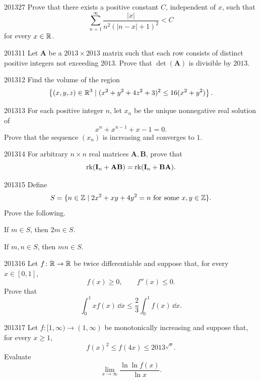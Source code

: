 \begin{problem}{2013}{2}{7}
Prove that there exists a positive constant $C$, independent of $x$, such that
\[
    \sum_{n=1}^{\infty}
    \frac{|x|}{n^2(|n-x|+1)^2}<C
\]
for every $x\in\mathbb{R}$.
\end{problem}

\begin{problem}{2013}{1}{1}
Let $\mathbf A$ be a $2013\times2013$ matrix such that each row consists of distinct positive integers not exceeding $2013$. Prove that $\det(\mathbf A)$ is divisible by $2013$.
\end{problem}

\begin{problem}{2013}{1}{2}
Find the volume of the region
\[
    \left\{(x, y, z)\in\mathbb{R}^3
    \mid
    (x^2+y^2+4z^2+3)^2\le16(x^2+y^2)
    \right\}.
\]
\end{problem}

\begin{problem}{2013}{1}{3}
For each positive integer $n$, let $x_n$ be the unique nonnegative real solution of
\[
    x^n+x^{n-1}+x-1=0.
\]
Prove that the sequence $(x_n)$ is increasing and converges to $1$.
\end{problem}

\begin{problem}{2013}{1}{4}
For arbitrary $n\times n$ real matrices $\mathbf A, \mathbf B$, prove that
\[
    \operatorname{rk}(\mathbf I_n+\mathbf A\mathbf B)
    =
    \operatorname{rk}(\mathbf I_n+\mathbf B\mathbf A).
\]
\end{problem}

\begin{problem}{2013}{1}{5}
Define
\[
    S=\{n\in\mathbb{Z}\mid 2x^2+xy+4y^2=n
    \text{ for some }x, y\in\mathbb{Z}\}.
\]
Prove the following.
\begin{problemsubparts}
    \item If $m\in S$, then $2m\in S$.
    \item If $m, n\in S$, then $mn\in S$.
\end{problemsubparts}
\end{problem}

\begin{problem}{2013}{1}{6}
Let $f\colon\mathbb{R}\to\mathbb{R}$ be twice differentiable and suppose that, for every $x\in[0, 1]$,
\[
    f(x)\ge0,
    \qquad
    f''(x)\le0.
\]
Prove that
\[
    \int_0^1 xf(x)\, \dd x
    \le
    \frac23\int_0^1f(x)\, \dd x.
\]
\end{problem}

\begin{problem}{2013}{1}{7}
Let $f\colon[1, \infty)\to(1, \infty)$ be monotonically increasing and suppose that, for every $x\ge1$,
\[
    f(x)^2\le f(4x)\le2013^{\sqrt x}.
\]
Evaluate
\[
    \lim_{x\to\infty}\frac{\ln\ln f(x)}{\ln x}.
\]
\end{problem}
